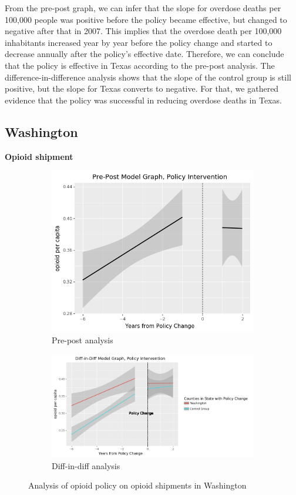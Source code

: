 \documentclass[12pt,letterpaper]{article}
\begin{document}
From the pre-post graph, we can infer that the slope for overdose deaths per 100,000 people was positive before the policy became effective, but changed to negative after that in 2007. This implies that the overdose death per 100,000 inhabitants increased year by year before the policy change and started to decrease annually after the policy's effective date. Therefore, we can conclude that the policy is effective in Texas according to the pre-post analysis. The difference-in-difference analysis shows that the slope of  the control group is still positive, but the slope for Texas converts to negative. For that, we gathered evidence that the policy was successful in reducing overdose deaths in Texas.

\subsection{Washington}
\textbf{Opioid shipment}

\begin{figure}[!h]
\centering
\begin{subfigure}{.5\textwidth}
  \centering
  \includegraphics[width=0.7\linewidth]{../30_results/General_Results/washington_opioid_shipment_prepost.png}
  \caption{Pre-post analysis}
  \label{fig:wa_ship_prepost}
\end{subfigure}%
\begin{subfigure}{.55\textwidth}
  \centering
  \includegraphics[width=1\linewidth]{../30_results/General_Results/washington_opioid_shipment_diffdiff.png}
  \caption{Diff-in-diff analysis}
  \label{fig:wa_ship_did}
\end{subfigure}
\caption{Analysis of opioid policy on opioid shipments in Washington}
\label{fig:wa_ship}
\end{figure}
\end{document}
